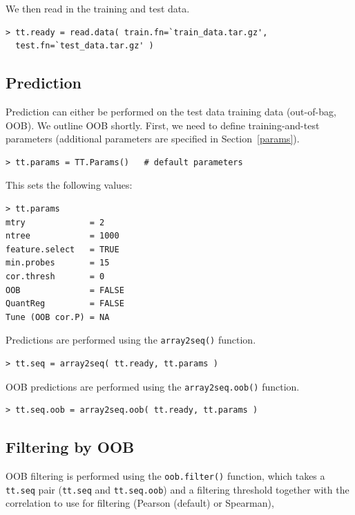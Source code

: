 \documentclass[a4paper,12pt]{article}
\begin{document}
We then read in the training and test data.

\begin{verbatim}
> tt.ready = read.data( train.fn=`train_data.tar.gz', 
  test.fn=`test_data.tar.gz' )
\end{verbatim}

\subsection{Prediction}
\label{usecase:prediction}

Prediction can either be performed on the test data training data (out-of-bag, OOB). We outline OOB shortly. First, we need to define training-and-test parameters (additional parameters are specified in Section~\ref{params}).
	
\begin{verbatim}
> tt.params = TT.Params()	# default parameters
\end{verbatim} 

This sets the following values:

\begin{verbatim}
> tt.params
mtry             = 2 
ntree            = 1000 
feature.select   = TRUE 
min.probes       = 15 
cor.thresh       = 0 
OOB              = FALSE 
QuantReg         = FALSE 
Tune (OOB cor.P) = NA
\end{verbatim}

Predictions are performed using the \texttt{array2seq()} function.

\begin{verbatim}
> tt.seq = array2seq( tt.ready, tt.params )
\end{verbatim}

OOB predictions are performed using the \texttt{array2seq.oob()} function.

\begin{verbatim}
> tt.seq.oob = array2seq.oob( tt.ready, tt.params )
\end{verbatim} 

\subsection{Filtering by OOB}
\label{usecase:filtering}

OOB filtering is performed using the \texttt{oob.filter()} function, which takes a \texttt{tt.seq} pair (\texttt{tt.seq} and \texttt{tt.seq.oob}) and a filtering threshold together with the correlation to use for filtering (Pearson (default) or Spearman),
	
\end{document}

